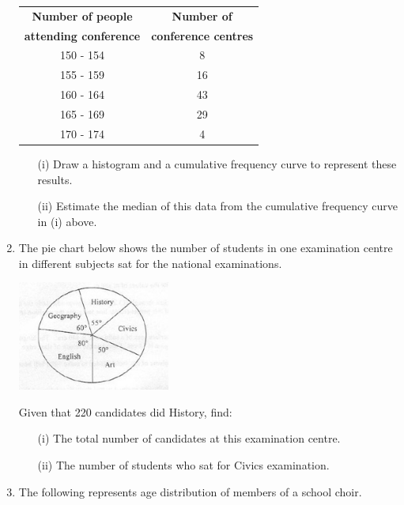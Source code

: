 \begin{enumerate}
	\begin{tabular}{|c|c|} \hline
	\textbf{Number of people}& \textbf{Number of}\\ 	\textbf{attending conference}&\textbf{conference centres} \\ \hline
	150 - 154&8 \\ \hline
	155 - 159&16 \\ \hline
	160 - 164&43 \\ \hline
	165 - 169&29 \\ \hline
	170 - 174&4 \\ \hline	
	\end{tabular}
	
	\begin{itemize}
	\item[(i)] Draw a histogram and a cumulative frequency curve to represent these results.
	\item[(ii)] Estimate the median of this data from the cumulative frequency curve in (i) above.
	\end{itemize}
	
	\item The pie chart below shows the number of students in one examination centre in different subjects sat for the national examinations.
	
	\begin{center}
	\includegraphics[width=5cm]{./img/stats1.jpg}
	\end{center}
	
	Given that 220 candidates did History, find:
	\begin{itemize}
	\item[(i)] The total number of candidates at this examination centre.
	\item[(ii)] The number of students who sat for Civics examination.
	\end{itemize}
	
	\item The following represents age distribution of members of a school choir.\\
	

\end{enumerate}
